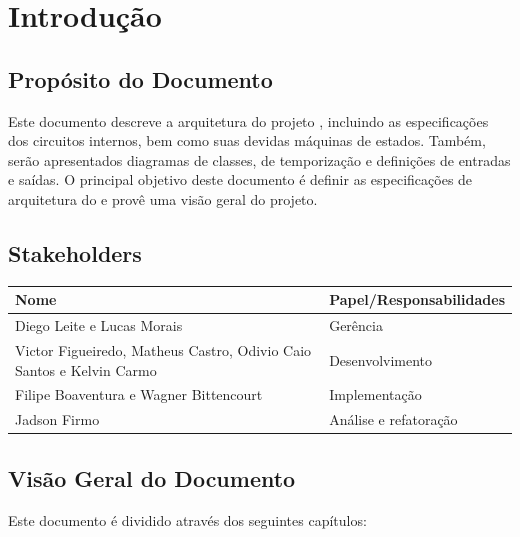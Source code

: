 \documentclass{report}
\begin{document}
\tableofcontents

\chapter{Introdução}
  
  \section{Propósito do Documento}
  Este documento descreve a arquitetura do projeto \ipPROCESSProject, incluindo as especificações dos circuitos internos, bem como suas devidas máquinas de estados. Também, serão apresentados diagramas de classes, de temporização e definições de entradas e saídas. O principal objetivo deste documento é definir as especificações de arquitetura do \ipPROCESSProject \space e provê uma visão geral do projeto.
  
  \section{Stakeholders}
    \FloatBarrier
    \begin{table}[H] 
      \begin{center}
        \begin{tabular}[pos]{|m{6cm} | m{8cm}|} 
          \hline 
          \cellcolor[gray]{0.9}\textbf{Nome} & \cellcolor[gray]{0.9}\textbf{Papel/Responsabilidades} \\ \hline
           Diego Leite e Lucas Morais & Gerência  \\ \hline
           Victor Figueiredo, Matheus Castro, Odivio Caio Santos e Kelvin Carmo & Desenvolvimento  \\ \hline
           Filipe Boaventura e Wagner Bittencourt & Implementação  \\ \hline
           Jadson Firmo & Análise e refatoração  \\ \hline
        \end{tabular}
      \end{center}
    \end{table} 

\section{Visão Geral do Documento}

Este documento é dividido através dos seguintes capítulos:
\end{document}
